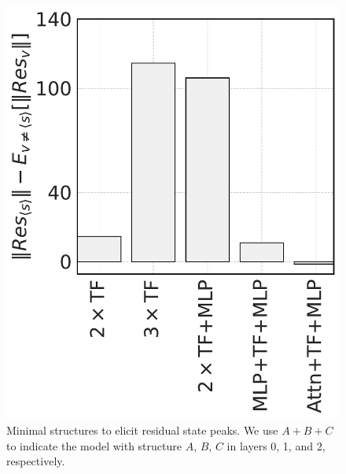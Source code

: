 \begin{figure}
    \centering
    \includegraphics[width=0.7\linewidth]{Figures/BBM_appendix/massive_norm_minimal.pdf}
    \caption{\small Minimal structures to elicit residual state peaks. We use $A+B+C$ to indicate the model with structure $A$, $B$, $C$ in layers 0, 1, and 2, respectively.}
    \label{appfigure:massive_minimal}
\end{figure}

